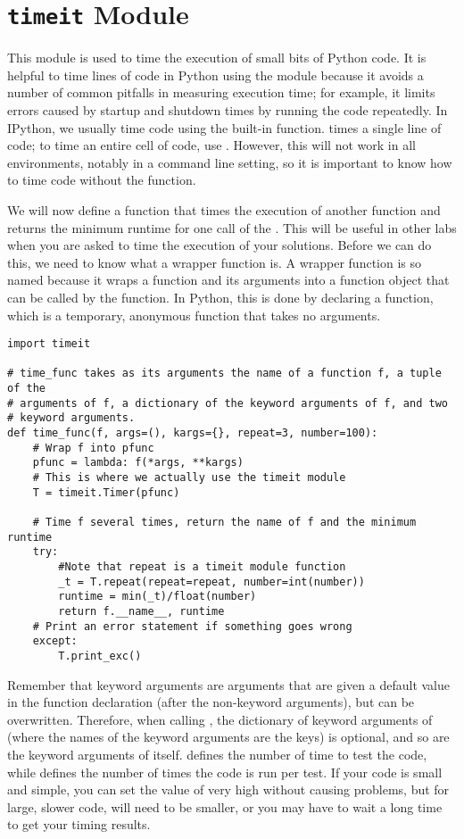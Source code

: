 \section*{\texttt{timeit} Module}
This module is used to time the execution of small bits of Python code.
It is helpful to time lines of code in Python using the  module because it avoids a number of common pitfalls in measuring execution time; for example, it limits errors caused by startup and shutdown times by running the code repeatedly. In IPython, we usually time code using the built-in  function.  times a single line of code; to time an entire cell of code, use . However, this will not work in all environments, notably in a command line setting, so it is important to know how to time code without the  function.

We will now define a function that times the execution of another function  and returns the minimum runtime for one call of the . This will be useful in other labs when you are asked to time the execution of your solutions. Before we can do this, we need to know what a wrapper function is. A wrapper function is so named because it wraps a function and its arguments into a function object that can be called by the  function. In Python, this is done by declaring a  function, which is a temporary, anonymous function that takes no arguments.

\begin{lstlisting}
import timeit

# time_func takes as its arguments the name of a function f, a tuple of the
# arguments of f, a dictionary of the keyword arguments of f, and two 
# keyword arguments.
def time_func(f, args=(), kargs={}, repeat=3, number=100):
	# Wrap f into pfunc
	pfunc = lambda: f(*args, **kargs)
	# This is where we actually use the timeit module
	T = timeit.Timer(pfunc)

	# Time f several times, return the name of f and the minimum runtime
	try:
		#Note that repeat is a timeit module function
		_t = T.repeat(repeat=repeat, number=int(number))
		runtime = min(_t)/float(number)
		return f.__name__, runtime
	# Print an error statement if something goes wrong
	except:
		T.print_exc()
\end{lstlisting}

Remember that keyword arguments are arguments that are given a default value in the function declaration (after the non-keyword arguments), but can be overwritten. Therefore, when calling , the dictionary of keyword arguments of  (where the names of the keyword arguments are the keys) is optional, and so are the keyword arguments of  itself.
 defines the number of time to test the code, while  defines the number of times the code is run per test. If your code is small and simple, you can set the value of  very high without causing problems, but for large, slower code,  will need to be smaller, or you may have to wait a long time to get your timing results.

